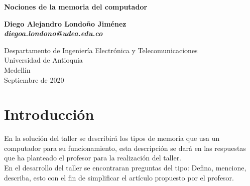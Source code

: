 \documentclass[12pt,letterpaper]{article}
\begin{document}

\begin{titlepage}
    \begin{center}
        \vspace*{1cm}
            
        \Huge
        \textbf{Nociones de la memoria del computador \textcolor{red}{\Biohazard}}
            
        \vspace{0.5cm}
        \LARGE
            
        \vspace{1.5cm}
            
        \textbf{Diego Alejandro Londoño Jiménez\\ \emph{diegoa.londono@udea.edu.co} }
            
        \vfill
            
        \vspace{0.8cm}
            
        \Large
        Despartamento de Ingeniería Electrónica y Telecomunicaciones\\
        Universidad de Antioquia\\
        Medellín\\
        Septiembre de 2020\\
        
            
    \end{center}
\end{titlepage}



\tableofcontents



\newpage

\section{Introducción}

En la solución del taller se describirá los tipos de memoria que usa un computador para su funcionamiento, esta descripción se dará en las respuestas que ha planteado el profesor para la realización del taller.\\

En el desarrollo del taller se encontraran preguntas del tipo: Defina, mencione, describa, esto con el fin de simplificar el artículo propuesto por el profesor.\\
\end{document}
